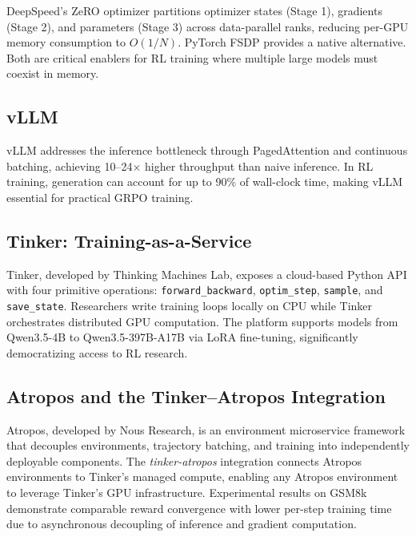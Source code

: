 \documentclass[12pt,a4paper]{report}
\theoremstyle{definition}
\begin{document}
DeepSpeed's ZeRO optimizer \cite{rajbhandari2020zero} partitions optimizer states (Stage 1), gradients (Stage 2), and parameters (Stage 3) across data-parallel ranks, reducing per-GPU memory consumption to $O(1/N)$. PyTorch FSDP provides a native alternative. Both are critical enablers for RL training where multiple large models must coexist in memory.

\subsection{vLLM}

vLLM \cite{kwon2023vllm} addresses the inference bottleneck through PagedAttention and continuous batching, achieving 10--24$\times$ higher throughput than naive inference. In RL training, generation can account for up to 90\% of wall-clock time, making vLLM essential for practical GRPO training.

\subsection{Tinker: Training-as-a-Service}

Tinker, developed by Thinking Machines Lab, exposes a cloud-based Python API with four primitive operations: \texttt{forward\_backward}, \texttt{optim\_step}, \texttt{sample}, and \texttt{save\_state}. Researchers write training loops locally on CPU while Tinker orchestrates distributed GPU computation. The platform supports models from Qwen3.5-4B to Qwen3.5-397B-A17B via LoRA fine-tuning, significantly democratizing access to RL research.

\subsection{Atropos and the Tinker--Atropos Integration}

Atropos, developed by Nous Research, is an environment microservice framework that decouples environments, trajectory batching, and training into independently deployable components. The \emph{tinker-atropos} integration connects Atropos environments to Tinker's managed compute, enabling any Atropos environment to leverage Tinker's GPU infrastructure. Experimental results on GSM8k demonstrate comparable reward convergence with lower per-step training time due to asynchronous decoupling of inference and gradient computation.


\end{document}
